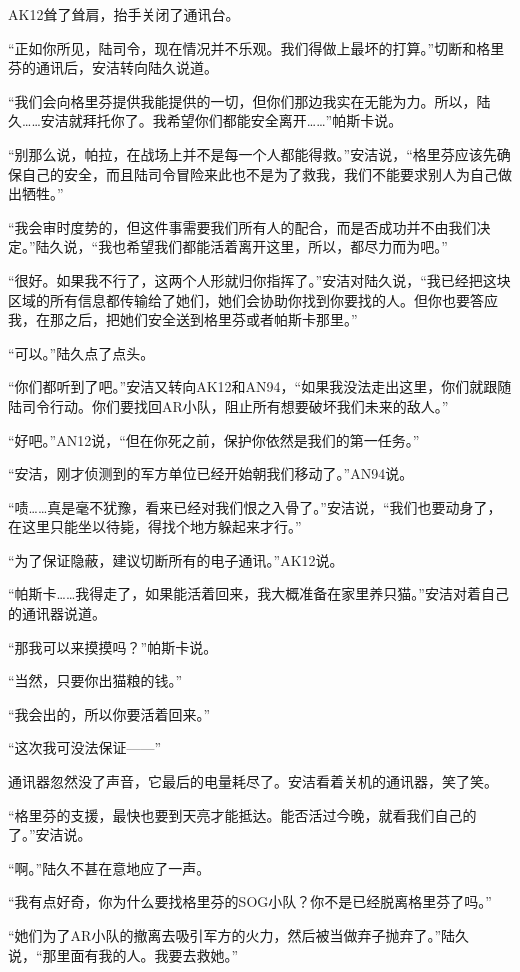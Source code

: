 AK12耸了耸肩，抬手关闭了通讯台。

“正如你所见，陆司令，现在情况并不乐观。我们得做上最坏的打算。”切断和格里芬的通讯后，安洁转向陆久说道。

“我们会向格里芬提供我能提供的一切，但你们那边我实在无能为力。所以，陆久……安洁就拜托你了。我希望你们都能安全离开……”帕斯卡说。

“别那么说，帕拉，在战场上并不是每一个人都能得救。”安洁说，“格里芬应该先确保自己的安全，而且陆司令冒险来此也不是为了救我，我们不能要求别人为自己做出牺牲。”

“我会审时度势的，但这件事需要我们所有人的配合，而是否成功并不由我们决定。”陆久说，“我也希望我们都能活着离开这里，所以，都尽力而为吧。”

“很好。如果我不行了，这两个人形就归你指挥了。”安洁对陆久说，“我已经把这块区域的所有信息都传输给了她们，她们会协助你找到你要找的人。但你也要答应我，在那之后，把她们安全送到格里芬或者帕斯卡那里。”

“可以。”陆久点了点头。

“你们都听到了吧。”安洁又转向AK12和AN94，“如果我没法走出这里，你们就跟随陆司令行动。你们要找回AR小队，阻止所有想要破坏我们未来的敌人。”

“好吧。”AN12说，“但在你死之前，保护你依然是我们的第一任务。”

“安洁，刚才侦测到的军方单位已经开始朝我们移动了。”AN94说。

“啧……真是毫不犹豫，看来已经对我们恨之入骨了。”安洁说，“我们也要动身了，在这里只能坐以待毙，得找个地方躲起来才行。”

“为了保证隐蔽，建议切断所有的电子通讯。”AK12说。

“帕斯卡……我得走了，如果能活着回来，我大概准备在家里养只猫。”安洁对着自己的通讯器说道。

“那我可以来摸摸吗？”帕斯卡说。

“当然，只要你出猫粮的钱。”

“我会出的，所以你要活着回来。”

“这次我可没法保证——”

通讯器忽然没了声音，它最后的电量耗尽了。安洁看着关机的通讯器，笑了笑。

“格里芬的支援，最快也要到天亮才能抵达。能否活过今晚，就看我们自己的了。”安洁说。

“啊。”陆久不甚在意地应了一声。

“我有点好奇，你为什么要找格里芬的SOG小队？你不是已经脱离格里芬了吗。”

“她们为了AR小队的撤离去吸引军方的火力，然后被当做弃子抛弃了。”陆久说，“那里面有我的人。我要去救她。”

